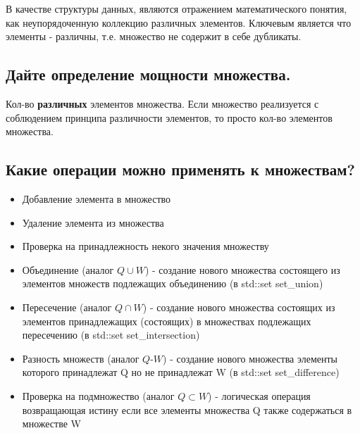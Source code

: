 \documentclass[a4paper,12pt]{article}
\begin{document}
	В качестве структуры данных, являются отражением математического понятия, как неупорядоченную коллекцию различных элементов. Ключевым является что элементы - различны, т.е. множество не содержит в себе дубликаты.   
	
	\subsection{Дайте определение мощности множества.}
	
	Кол-во \textbf{различных} элементов множества. Если множество реализуется с соблюдением принципа различности элементов, то просто кол-во элементов множества.
	
	\subsection{Какие операции можно применять к множествам?}
	
	\begin{itemize}
		\item Добавление элемента в множество
		\item Удаление элемента из множества 
		\item Проверка на принадлежность некого значения множеству
		\item Объединение (аналог $Q \cup W$) - создание нового множества состоящего из элементов множеств подлежащих объединению (в std::set set\_union)
		\item Пересечение (аналог $Q \cap W$) - создание нового множества состоящих из элементов принадлежащих (состоящих) в множествах подлежащих пересечению (в std::set set\_intersection)
		\item Разность множеств (аналог $Q$-$W$) - создание нового множества элементы которого принадлежат Q но не принадлежат W (в std::set set\_difference)
		\item Проверка на подмножество (аналог $Q \subset W$) - логическая операция возвращающая истину если все элементы множества Q также содержаться в множестве W
	\end{itemize}
	
	
\end{document}
